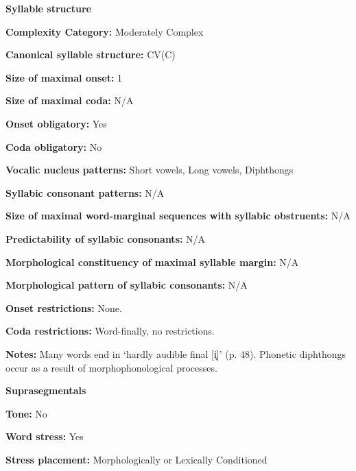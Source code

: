 \textbf{Syllable structure}



\textbf{Complexity Category:} Moderately Complex



\textbf{Canonical syllable structure:} CV(C) \citep[41]{Treis2008}



\textbf{Size of maximal onset:} 1



\textbf{Size of maximal coda:} N/A



\textbf{Onset obligatory:} Yes



\textbf{Coda obligatory:} No



\textbf{Vocalic nucleus patterns:} Short vowels, Long vowels, Diphthongs



\textbf{Syllabic consonant patterns:} N/A



\textbf{Size of maximal word{}-marginal sequences with syllabic obstruents:} N/A



\textbf{Predictability of syllabic consonants:} N/A



\textbf{Morphological constituency of maximal syllable margin:} N/A



\textbf{Morphological pattern of syllabic consonants:} N/A



\textbf{Onset restrictions:} None.



\textbf{Coda restrictions:} Word-finally, no restrictions.



\textbf{Notes:} Many words end in ‘hardly audible final [i̥]’ (p. 48). Phonetic diphthongs occur as a result of morphophonological processes.



\textbf{Suprasegmentals}



\textbf{Tone:} No



\textbf{Word stress:} Yes



\textbf{Stress placement:} Morphologically or Lexically Conditioned



